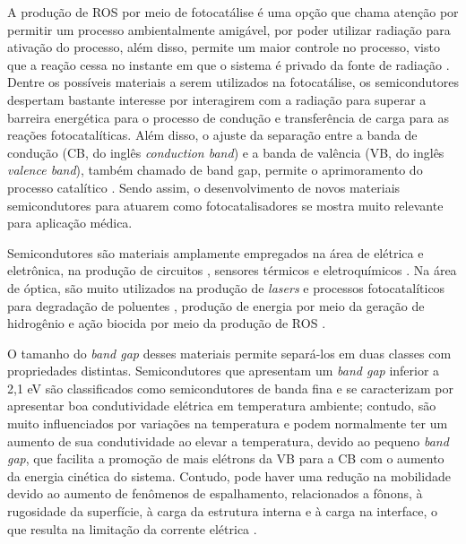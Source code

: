 A produção de ROS por meio de fotocatálise é uma opção que chama atenção por permitir um processo ambientalmente amigável, por poder utilizar radiação para ativação do processo, além disso, permite um maior controle no processo, visto que a reação cessa no instante em que o sistema é privado da fonte de radiação \cite{he2025photocatalytic}. Dentre os possíveis materiais a serem utilizados na fotocatálise, os semicondutores despertam bastante interesse por interagirem com a radiação para superar a barreira energética para o processo de condução e transferência de carga para as reações fotocatalíticas. Além disso, o ajuste da separação entre a banda de condução (CB, do inglês \textit{conduction band}) e a banda de valência (VB, do inglês \textit{valence band}), também chamado de band gap, permite o aprimoramento do processo catalítico \cite{wang2018design}. Sendo assim, o desenvolvimento de novos materiais semicondutores para atuarem como fotocatalisadores se mostra muito relevante para aplicação médica. 

Semicondutores são materiais amplamente empregados na área de elétrica e eletrônica, na produção de circuitos \cite{fan2023two}, sensores térmicos \cite{malits2017nanometric} e eletroquímicos \cite{cui2022electrochemical}. Na área de óptica, são muito utilizados na produção de \textit{lasers} \cite{ahn2023colloidal} e processos fotocatalíticos para degradação de poluentes \cite{zhong2024situ}, produção de energia por meio da geração de hidrogênio \cite{alfa2024recent} e ação biocida por meio da produção de ROS \cite{he2020multifunctional}.

O tamanho do \textit{band gap} desses materiais permite separá-los em duas classes com propriedades distintas. Semicondutores que apresentam um \textit{band gap} inferior a 2,1 eV são classificados como semicondutores de banda fina \cite{zhang2023recent} e se caracterizam por apresentar boa condutividade elétrica em temperatura ambiente; contudo, são muito influenciados por variações na temperatura e podem normalmente ter um aumento de sua condutividade ao elevar a temperatura, devido ao pequeno \textit{band gap}, que facilita a promoção de mais elétrons da VB para a CB com o aumento da energia cinética do sistema. Contudo, pode haver uma redução na mobilidade devido ao aumento de fenômenos de espalhamento, relacionados a fônons, à rugosidade da superfície, à carga da estrutura interna e à carga na interface, o que resulta na limitação da corrente elétrica \cite{wolpert2011managing}.

